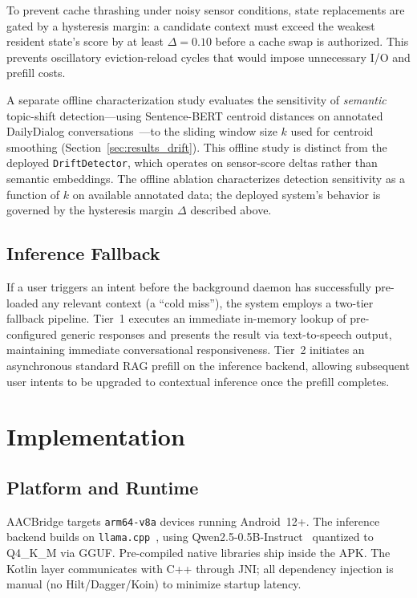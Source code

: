 \documentclass[journal]{IEEEtran}
\begin{document}
To prevent cache thrashing under noisy sensor conditions, state replacements are gated by a hysteresis margin: a candidate context must exceed the weakest resident state's score by at least $\Delta = 0.10$ before a cache swap is authorized. This prevents oscillatory eviction-reload cycles that would impose unnecessary I/O and prefill costs.

A separate offline characterization study evaluates the sensitivity of \emph{semantic} topic-shift detection---using Sentence-BERT centroid distances on annotated DailyDialog conversations~\cite{dailydialog}---to the sliding window size $k$ used for centroid smoothing (Section~\ref{sec:results_drift}). This offline study is distinct from the deployed \texttt{DriftDetector}, which operates on sensor-score deltas rather than semantic embeddings. The offline ablation characterizes detection sensitivity as a function of $k$ on available annotated data; the deployed system's behavior is governed by the hysteresis margin $\Delta$ described above.

\subsection{Inference Fallback}
\label{sec:fallback}

If a user triggers an intent before the background daemon has successfully pre-loaded any relevant context (a ``cold miss''), the system employs a two-tier fallback pipeline. Tier~1 executes an immediate in-memory lookup of pre-configured generic responses and presents the result via text-to-speech output, maintaining immediate conversational responsiveness. Tier~2 initiates an asynchronous standard RAG prefill on the inference backend, allowing subsequent user intents to be upgraded to contextual inference once the prefill completes.

\section{Implementation}
\label{sec:implementation}

\subsection{Platform and Runtime}
\label{sec:platform}

AACBridge targets \texttt{arm64-v8a} devices running Android~12+. The inference backend builds on \texttt{llama.cpp}~\cite{llamacpp}, using Qwen2.5-0.5B-Instruct~\cite{qwen25} quantized to Q4\_K\_M via GGUF. Pre-compiled native libraries ship inside the APK. The Kotlin layer communicates with C++ through JNI; all dependency injection is manual (no Hilt/Dagger/Koin) to minimize startup latency.
\end{document}
